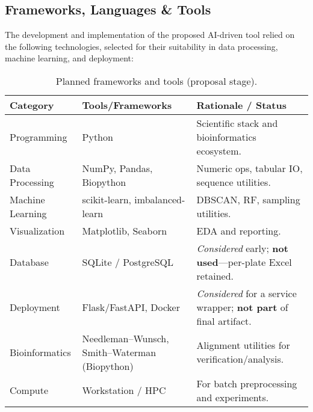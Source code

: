 \subsection{Frameworks, Languages \& Tools}
The development and implementation of the proposed AI-driven tool relied on the following technologies, selected for their suitability in data processing, machine learning, and deployment:

\begin{table}[h]
\centering
\caption{Planned frameworks and tools (proposal stage).}
\label{tab:frameworks}
\begin{tabular}{|p{3.6cm}|p{3.8cm}|p{6.2cm}|}
\hline
\textbf{Category} & \textbf{Tools/Frameworks} & \textbf{Rationale / Status} \\ \hline
Programming & Python & Scientific stack and bioinformatics ecosystem. \\ \hline
Data Processing & NumPy, Pandas, Biopython & Numeric ops, tabular IO, sequence utilities. \\ \hline
Machine Learning & scikit-learn, imbalanced-learn & DBSCAN, RF, sampling utilities. \\ \hline
Visualization & Matplotlib, Seaborn & EDA and reporting. \\ \hline
Database & SQLite / PostgreSQL & \emph{Considered} early; \textbf{not used}—per-plate Excel retained. \\ \hline
Deployment & Flask/FastAPI, Docker & \emph{Considered} for a service wrapper; \textbf{not part} of final artifact. \\ \hline
Bioinformatics & Needleman–Wunsch, Smith–Waterman (Biopython) & Alignment utilities for verification/analysis. \\ \hline
Compute & Workstation / HPC & For batch preprocessing and experiments. \\ \hline
\end{tabular}
\end{table}


